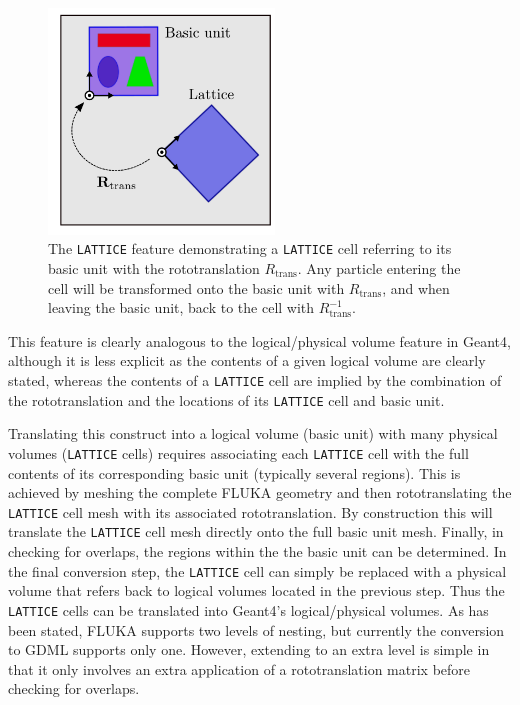 \documentclass[final,5p,times,twocolumn]{elsarticle}
\newcommand{\fluka}[1]{\texttt{\MakeUppercase{#1}}}
\begin{document}
\begin{figure}[htbp]
\begin{center}
\includegraphics[width=6cm]{./diagrams/lattice}
\caption{The \fluka{lattice} feature demonstrating a \fluka{lattice} cell
  referring to its basic unit with the rototranslation $R_\textrm{trans}$.
  Any particle entering the cell will be transformed onto the basic unit
  with $R_\textrm{trans}$, and when leaving the basic unit, back to the cell
  with $R_\textrm{trans}^{-1}$.}
\label{fig:lattice}
\end{center}
\end{figure}

This feature is clearly analogous to the logical/physical volume feature in
Geant4, although it is less explicit as the contents of a given logical
volume are clearly stated, whereas the contents of a \fluka{lattice} cell
are implied by the combination of the rototranslation and the locations of
its \fluka{lattice} cell and basic unit.

Translating this construct into a logical volume (basic unit) with many
physical volumes (\fluka{lattice} cells) requires associating each
\fluka{lattice} cell with the full contents of its corresponding basic unit
(typically several regions). This is achieved by meshing the complete
FLUKA geometry and then rototranslating the \fluka{lattice} cell mesh with
its associated rototranslation. By construction this will translate the
\fluka{lattice} cell mesh directly onto the full basic unit mesh. Finally,
in checking for overlaps, the regions within the the basic unit can be
determined. In the final conversion step, the \fluka{lattice} cell can
simply be replaced with a physical volume that refers back to logical
volumes located in the previous step. Thus the \fluka{lattice} cells can
be translated into Geant4's logical/physical volumes. As has been stated,
FLUKA supports two levels of nesting, but currently the conversion to GDML
supports only one. However, extending to an extra level is simple in that
it only involves an extra application of a rototranslation matrix before
checking for overlaps.
\end{document}
